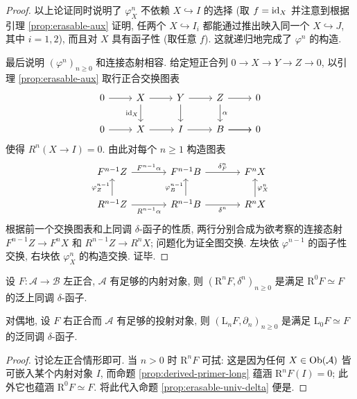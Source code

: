 \begin{proof}
	以上论证同时说明了 $\varphi^n_X$ 不依赖 $X \hookrightarrow I$ 的选择 (取 $f = \mathrm{id}_X$ 并注意到根据引理 \ref{prop:erasable-aux} 证明, 任两个 $X \hookrightarrow I_i$ 都能通过推出映入同一个 $X \hookrightarrow J$, 其中 $i=1,2$), 而且对 $X$ 具有函子性 (取任意 $f$). 这就递归地完成了 $\varphi^n$ 的构造.
	
	最后说明 $(\varphi^n)_{n \geq 0}$ 和连接态射相容. 给定短正合列 $0 \to X \to Y \to Z \to 0$, 以引理 \ref{prop:erasable-aux} 取行正合交换图表
	\[\begin{tikzcd}
		0 \arrow[r] & X \arrow[d, "\identity_X"'] \arrow[r] & Y \arrow[r] \arrow[d] & Z \arrow[d, "\alpha"] \arrow[r] & 0 \\
		0 \arrow[r] & X \arrow[r] & I \arrow[r] & \arrow[r] B \arrow[r] & 0
	\end{tikzcd}\]
	使得 $R^n(X \to I) = 0$. 由此对每个 $n \geq 1$ 构造图表
	\[\begin{tikzcd}[column sep=large]
		F^{n-1} Z \arrow[r, "{F^{n-1}\alpha}"] & F^{n-1} B \arrow[r, "{\delta_F^n}"] & F^n X \\
		R^{n-1} Z \arrow[u, "{\varphi_Z^{n-1}}"] \arrow[r, "{R^{n-1}\alpha}"'] & R^{n-1} B \arrow[u, "{\varphi_B^{n-1}}"] \arrow[r, "{\delta^n}"'] & R^n X \arrow[u, "{\varphi_X^n}"'] 
	\end{tikzcd}\]
	根据前一个交换图表和上同调 $\delta$-函子的性质, 两行分别合成为欲考察的连接态射 $F^{n-1} Z \to F^n X$ 和 $R^{n-1} Z \to R^n X$; 问题化为证全图交换. 左块依 $\varphi^{n-1}$ 的函子性交换, 右块依 $\varphi^n_X$ 的构造交换. 证毕.
\end{proof}

\begin{corollary}[导出函子的刻画]\label{prop:derived-erasable}
	设 $F: \mathcal{A} \to \mathcal{B}$ 左正合, $\mathcal{A}$ 有足够的内射对象, 则 $(\mathrm{R}^n F, \delta^n)_{n \geq 0}$ 是满足 $\mathrm{R}^0 F \simeq F$ 的泛上同调 $\delta$-函子.
	
	对偶地, 设 $F$ 右正合而 $\mathcal{A}$ 有足够的投射对象, 则 $(\mathrm{L}_n F, \partial_n)_{n \geq 0}$ 是满足 $\mathrm{L}_0 F \simeq F$ 的泛同调 $\delta$-函子.
\end{corollary}
\begin{proof}
	讨论左正合情形即可. 当 $n > 0$ 时 $\mathrm{R}^n F$ 可拭: 这是因为任何 $X \in \operatorname{Ob}(\mathcal{A})$ 皆可嵌入某个内射对象 $I$, 而命题 \ref{prop:derived-primer-long} 蕴涵 $\mathrm{R}^n F(I) = 0$; 此外它也蕴涵 $\mathrm{R}^0 F \simeq F$. 将此代入命题 \ref{prop:erasable-univ-delta} 便是.
\end{proof}

